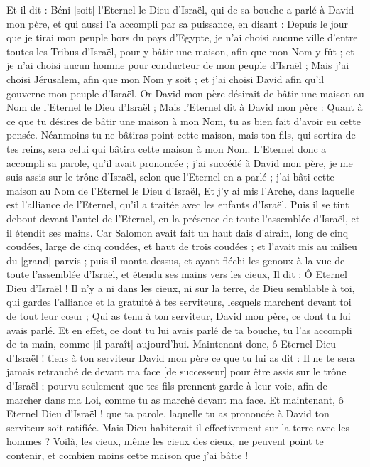 \begin{multicols}{2}
Et il dit : Béni [soit] l'Eternel le Dieu d'Israël, qui de sa bouche a parlé à David mon père, et qui aussi l'a accompli par sa puissance, en disant :
Depuis le jour que je tirai mon peuple hors du pays d'Egypte, je n'ai choisi aucune ville d'entre toutes les Tribus d'Israël, pour y bâtir une maison, afin que mon Nom y fût ; et je n'ai choisi aucun homme pour conducteur de mon peuple d'Israël ;
Mais j'ai choisi Jérusalem, afin que mon Nom y soit ; et j'ai choisi David afin qu'il gouverne mon peuple d'Israël.
Or David mon père désirait de bâtir une maison au Nom de l'Eternel le Dieu d'Israël ;
Mais l'Eternel dit à David mon père : Quant à ce que tu désires de bâtir une maison à mon Nom, tu as bien fait d'avoir eu cette pensée.
Néanmoins tu ne bâtiras point cette maison, mais ton fils, qui sortira de tes reins, sera celui qui bâtira cette maison à mon Nom.
L'Eternel donc a accompli sa parole, qu'il avait prononcée ; j'ai succédé à David mon père, je me suis assis sur le trône d'Israël, selon que l'Eternel en a parlé ; j'ai bâti cette maison au Nom de l'Eternel le Dieu d'Israël,
Et j'y ai mis l'Arche, dans laquelle est l'alliance de l'Eternel, qu'il a traitée avec les enfants d'Israël.
Puis il se tint debout devant l'autel de l'Eternel, en la présence de toute l'assemblée d'Israël, et il étendit ses mains.
Car Salomon avait fait un haut dais d'airain, long de cinq coudées, large de cinq coudées, et haut de trois coudées ; et l'avait mis au milieu du [grand] parvis ; puis il monta dessus, et ayant fléchi les genoux à la vue de toute l'assemblée d'Israël, et étendu ses mains vers les cieux,
Il dit : Ô Eternel Dieu d'Israël ! Il n'y a ni dans les cieux, ni sur la terre, de Dieu semblable à toi, qui gardes l'alliance et la gratuité à tes serviteurs, lesquels marchent devant toi de tout leur cœur ;
Qui as tenu à ton serviteur, David mon père, ce dont tu lui avais parlé. Et en effet, ce dont tu lui avais parlé de ta bouche, tu l'as accompli de ta main, comme [il paraît] aujourd'hui.
Maintenant donc, ô Eternel Dieu d'Israël ! tiens à ton serviteur David mon père ce que tu lui as dit : Il ne te sera jamais retranché de devant ma face [de successeur] pour être assis sur le trône d'Israël ; pourvu seulement que tes fils prennent garde à leur voie, afin de marcher dans ma Loi, comme tu as marché devant ma face.
Et maintenant, ô Eternel Dieu d'Israël ! que ta parole, laquelle tu as prononcée à David ton serviteur soit ratifiée.
Mais Dieu habiterait-il effectivement sur la terre avec les hommes ? Voilà, les cieux, même les cieux des cieux, ne peuvent point te contenir, et combien moins cette maison que j'ai bâtie !

\end{multicols}
